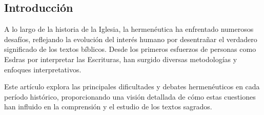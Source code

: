 \begin{multicols}{2}
    \begin{minipage}[t]{0.45\textwidth} %
        \tableofcontents
    \end{minipage}
    \hfill
    \begin{minipage}[t]{0.45\textwidth}
        \section{Introducción}

        A lo largo de la historia de la Iglesia, la hermenéutica ha enfrentado numerosos desafíos, reflejando la evolución del interés humano por desentrañar el verdadero significado de los textos bíblicos. Desde los primeros esfuerzos de personas como Esdras por interpretar las Escrituras, han surgido diversas metodologías y enfoques interpretativos.

        Este artículo explora las principales dificultades y debates hermenéuticos en cada período histórico, proporcionando una visión detallada de cómo estas cuestiones han influido en la comprensión y el estudio de los textos sagrados.
    \end{minipage}
\end{multicols}